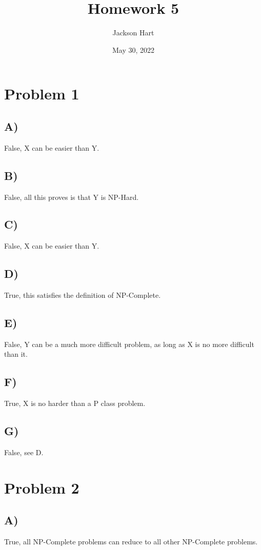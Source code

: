 \documentclass[12pt, letterpaper]{article}
\title{Homework 5}
\author{Jackson Hart}
\date{May 30, 2022}
\begin{document}
\maketitle

\section*{Problem 1}
\subsection*{A)}
False, X can be easier than Y.

\subsection*{B)}
False, all this proves is that Y is NP-Hard.

\subsection*{C)}
False, X can be easier than Y.

\subsection*{D)}
True, this satisfies the definition of NP-Complete.

\subsection*{E)}
False, Y can be a much more difficult problem, as long as X is no more difficult than it.

\subsection*{F)}
True, X is no harder than a P class problem.

\subsection*{G)}
False, see D.

\section*{Problem 2}
\subsection*{A)}
True, all NP-Complete problems can reduce to all other NP-Complete problems.
\end{document}
